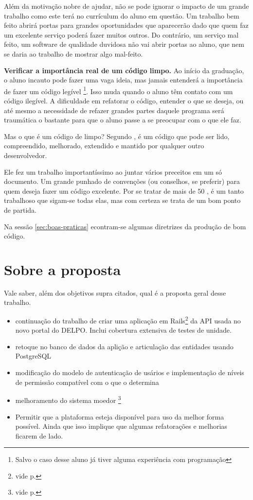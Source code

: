 Além da motivação nobre de ajudar, não se pode ignorar o impacto de um grande trabalho como
este terá no currículum do aluno em questão. Um trabalho bem feito abrirá portas para grandes
oportunidades que aparecerão dado que quem faz um excelente serviço poderá fazer muitos outros.
Do contrário, um serviço mal feito, um software de qualidade duvidosa não vai abrir portas ao
aluno, que nem se daria ao trabalho de mostrar algo mal-feito.

\textbf{Verificar a importância real de um código limpo.} Ao início da graduação, o aluno incauto
pode fazer uma vaga ideia, mas jamais entenderá a importância de fazer um código legível
\footnote{Salvo o caso desse aluno já tiver alguma experiência com programação}. Isso muda quando
o aluno têm contato com um código ilegível. A dificuldade em refatorar o código, entender o que se
deseja, ou até mesmo a necessidade de refazer grandes partes daquele programa será traumática o
bastante para que o aluno passe a se preocupar com o que ele faz.

Mas o que é um código de limpo? Segundo \citeauthor{CCL}, é um código que pode ser lido, compreendido,
melhorado, extendido e mantido por qualquer outro desenvolvedor.

Ele fez um trabalho importantíssimo ao juntar vários preceitos em um só documento. Um grande punhado
de convenções (ou conselhos, se preferir) para quem deseja fazer um código excelente. Por se tratar de
mais de 50 , é um tanto trabalhoso que sigam-se todas elas, mas com certeza se trata de um bom
ponto de partida.

Na sessão \ref{sec:boas-praticas} econtram-se algumas diretrizes da produção de bom código.

\section{Sobre a proposta} \label{sec:proposta}

Vale saber, além dos objetivos supra citados, qual é a proposta geral desse trabalho.
\begin{itemize}
    \item continuação do trabalho de criar uma aplicação em Rails\footnote{vide p.\pageref{subsec:rails}}
    da API usada no novo portal do DELPO. Inclui cobertura extensiva de testes de unidade.
    \item retoque no banco de dados da aplição e articulação das entidades usando PostgreSQL
    \item modificação do modelo de autenticação de usários e implementação de níveis de permissão compatível
    com o que o  determina
    \item melhoramento do sistema moedor \footnote{vide p.\pageref{subsec:moagem}}
    \item Permitir que a plataforma esteja disponível para uso da melhor forma possível. Ainda que isso
    implique que algumas refatorações e melhorias ficarem de lado.
\end{itemize}


